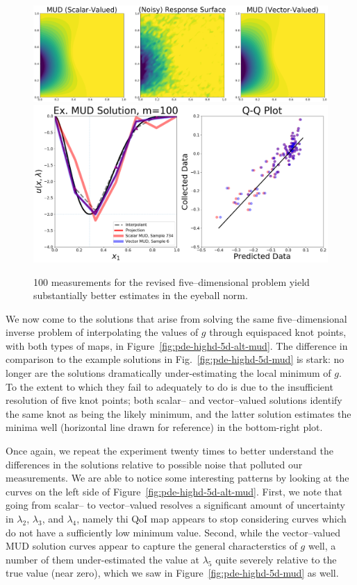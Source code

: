 \begin{figure}[htbp]
\centering
  \includegraphics[width=0.95\linewidth]{figures/pde-highd/pde-highd_surf_exmud_D5-alt_m100}
  \includegraphics[width=0.9\linewidth]{figures/pde-highd/pde-highd-alt_comp_exmud_D5_m100}
\caption{
100 measurements for the revised five--dimensional problem yield substantially better estimates in the eyeball norm.
}
\label{fig:pde-highd-5d-alt-example}
\end{figure}

We now come to the solutions that arise from solving the same five--dimensional inverse problem of interpolating the values of $g$ through equispaced knot points, with both types of maps, in Figure~\ref{fig:pde-highd-5d-alt-mud}.
The difference in comparison to the example solutions in Fig.~\ref{fig:pde-highd-5d-mud} is stark: no longer are the solutions dramatically under-estimating the local minimum of $g$.
To the extent to which they fail to adequately to do is due to the insufficient resolution of five knot points; both scalar-- and vector--valued solutions identify the same knot as being the likely minimum, and the latter solution estimates the minima well (horizontal line drawn for reference) in the bottom-right plot.

Once again, we repeat the experiment twenty times to better understand the differences in the solutions relative to possible noise that polluted our measurements.
We are able to notice some interesting patterns by looking at the curves on the left side of Figure~\ref{fig:pde-highd-5d-alt-mud}.
First, we note that going from scalar-- to vector--valued resolves a significant amount of uncertainty in $\lambda_2$, $\lambda_3$, and $\lambda_4$, namely thi QoI map appears to stop considering curves which do not have a sufficiently low minimum value.
Second, while the vector--valued MUD solution curves appear to capture the general characterstics of $g$ well, a number of them under-estimated the value at $\lambda_5$ quite severely relative to the true value (near zero), which we saw in Figure~\ref{fig:pde-highd-5d-mud} as well.

